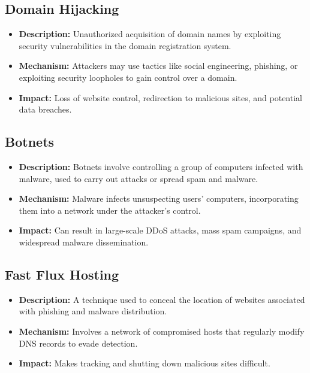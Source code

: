 \subsection{Domain Hijacking}
\begin{itemize}
    \item \textbf{Description:} Unauthorized acquisition of domain names by exploiting security vulnerabilities in the domain registration system.\cite{inta2023dnstypo}
    \item \textbf{Mechanism:} Attackers may use tactics like social engineering, phishing, or exploiting security loopholes to gain control over a domain.
    \item \textbf{Impact:} Loss of website control, redirection to malicious sites, and potential data breaches.
\end{itemize}

\subsection{Botnets}
\begin{itemize}
    \item \textbf{Description:} Botnets involve controlling a group of computers infected with malware, used to carry out attacks or spread spam and malware.\cite{citpyour}
    \item \textbf{Mechanism:} Malware infects unsuspecting users’ computers, incorporating them into a network under the attacker's control.
    \item \textbf{Impact:} Can result in large-scale DDoS attacks, mass spam campaigns, and widespread malware dissemination.
\end{itemize}

\subsection{Fast Flux Hosting}
\begin{itemize}
    \item \textbf{Description:} A technique used to conceal the location of websites associated with phishing and malware distribution.\cite{lin2013genetic}
    \item \textbf{Mechanism:} Involves a network of compromised hosts that regularly modify DNS records to evade detection.
    \item \textbf{Impact:} Makes tracking and shutting down malicious sites difficult.
\end{itemize}

